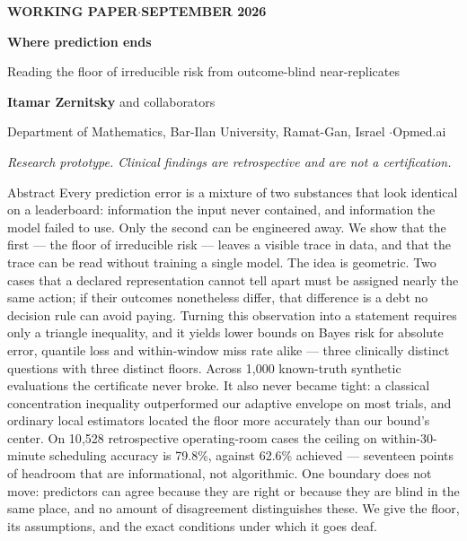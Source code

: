 \documentclass[11pt,a4paper]{article}
\begin{document}
\thispagestyle{empty}

\begin{center}
{\small\bfseries\color{accent} WORKING PAPER\quad$\cdot$\quad SEPTEMBER 2026}\par
\vspace{1.1em}
{\Huge\bfseries\color{ink} Where prediction ends}\par
\vspace{0.7em}
{\large\color{ink} Reading the floor of irreducible risk from outcome-blind near-replicates}\par
\vspace{1.3em}
{\normalsize\bfseries Itamar Zernitsky} \;and collaborators\par
\vspace{0.3em}
{\small Department of Mathematics, Bar-Ilan University, Ramat-Gan, Israel \quad$\cdot$\quad Opmed.ai}\par
\vspace{0.9em}
{\small\itshape Research prototype. Clinical findings are retrospective and are not a certification.}\par
\end{center}

\vspace{0.8em}

\begin{keybox}{Abstract}
Every prediction error is a mixture of two substances that look identical on a leaderboard: information the input never contained, and information the model failed to use. Only the second can be engineered away. We show that the first --- the floor of irreducible risk --- leaves a visible trace in data, and that the trace can be read without training a single model. The idea is geometric. Two cases that a declared representation cannot tell apart must be assigned nearly the same action; if their outcomes nonetheless differ, that difference is a debt no decision rule can avoid paying. Turning this observation into a statement requires only a triangle inequality, and it yields lower bounds on Bayes risk for absolute error, quantile loss and within-window miss rate alike --- three clinically distinct questions with three distinct floors. Across 1{,}000 known-truth synthetic evaluations the certificate never broke. It also never became tight: a classical concentration inequality outperformed our adaptive envelope on most trials, and ordinary local estimators located the floor more accurately than our bound's center. On 10{,}528 retrospective operating-room cases the ceiling on within-30-minute scheduling accuracy is 79.8\%, against 62.6\% achieved --- seventeen points of headroom that are informational, not algorithmic. One boundary does not move: predictors can agree because they are right or because they are blind in the same place, and no amount of disagreement distinguishes these. We give the floor, its assumptions, and the exact conditions under which it goes deaf.
\end{keybox}
\end{document}
